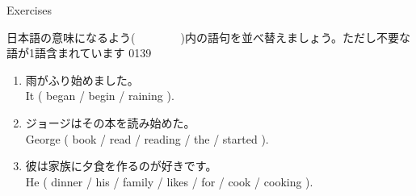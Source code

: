 \documentclass[aspectratio=169,xcolor={dvipsnames,table}]{beamer}
\begin{document}
\begin{frame}[plain]{Exercises}

{\small 日本語の意味になるよう(~~~~~~~~)内の語句を並べ替えましょう。ただし不要な語が1語含まれています}%
\hfill{\tiny 0139}\,{\scriptsize {}}
\begin{enumerate}
 \item 雨がふり始めました。\\
       It ( began / begin / raining ).\\
 \item ジョージはその本を読み始めた。\\
       George ( book / read / reading / the / started ).\\
 \item 彼は家族に夕食を作るのが好きです。\\
       He ( dinner / his / family / likes / for / cook / cooking ).\\
\end{enumerate}
\end{frame}
\end{document}

